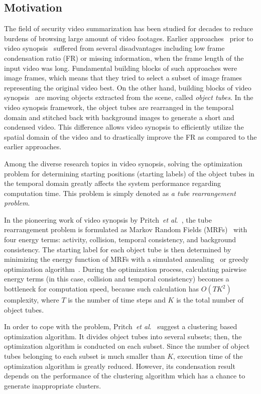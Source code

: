 \documentclass[11pt]{hyu_thesis}
\newcommand{\etal}{\textit{et al}.}
\begin{document}
\subsection{Motivation}
\label{sec:intro:motivation}
The field of security video summarization has been studied for decades to reduce burdens of browsing large amount of video footages. Earlier approaches~\cite{Smith1998,Petrovic2005,Hoferlin2011} prior to video synopsis~\cite{Rav-Acha2006,Pritch2007,Pritch2008} suffered from several disadvantages including low frame condensation ratio (FR) or missing information, when the frame length of the input video was long. Fundamental building blocks of such approaches were image frames, which means that they tried to select a subset of image frames representing the original video best. On the other hand, building blocks of video synopsis~\cite{Rav-Acha2006,Pritch2007,Pritch2008} are moving objects extracted from the scene, called \textit{object tubes}. In the video synopsis framework, the object tubes are rearranged in the temporal domain and stitched back with background images to generate a short and condensed video. This difference allows video synopsis to efficiently utilize the spatial domain of the video and to drastically improve the FR as compared to the earlier approaches.

Among the diverse research topics in video synopsis, solving the optimization problem for determining starting positions (starting labels) of the object tubes in the temporal domain greatly affects the system performance regarding computation time. This problem is simply denoted as \textit{a tube rearrangement problem}.

In the pioneering work of video synopsis by Pritch~\etal~\cite{Pritch2008}, the tube rearrangement problem is formulated as Markov Random Fields (MRFs)~\cite{Kolmogorov2004} with four energy terms: activity, collision, temporal consistency, and background consistency. The starting label for each object tube is then determined by minimizing the energy function of MRFs with a simulated annealing~\cite{Kirkpatrick1983} or greedy optimization algorithm~\cite{Cormen2009}. During the optimization process, calculating pairwise energy terms (in this case, collision and temporal consistency) becomes a bottleneck for computation speed, because such calculation has $O(TK^2)$ complexity, where $T$ is the number of time steps and $K$ is the total number of object tubes.

In order to cope with the problem, Pritch~\etal~\cite{Pritch2009} suggest
a clustering based optimization algorithm. It divides object tubes into several subsets; then, the optimization algorithm is conducted on each subset. Since the number of object tubes belonging to each subset is much smaller than $K$, execution time of the optimization algorithm is greatly reduced. However, its condensation result depends on the performance of the clustering algorithm which has a chance to
generate inappropriate clusters.
\end{document}
